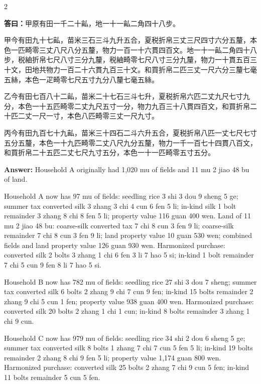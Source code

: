 \documentclass[11pt,a4paper]{article}
\newcommand{\AnswerText}[1]{\par\noindent\textbf{\color{answercolor}答曰：}#1\par}
\newcommand{\AnswerEn}[1]{\par\noindent\textbf{\color{answercolor}Answer:} #1\par}
\begin{document}
\begin{paracol}{2}
\AnswerText{甲原有田一千二十畆，地一十一畆二角四十八步。

甲今有田九十七畆，苗米三石三斗九升五合，夏税折帛三丈三尺四寸六分五釐，本色一匹畸零三丈八尺八分五釐，物力一百一十六貫四百文。地一十一畆二角四十八步，税紬折帛七尺八寸三分九釐，税紬畸零七尺八寸三分九釐，物力一十貫五百三十文，田地共物力一百二十六貫九百三十文。和買折帛二匹三丈一尺六分三釐七毫五絲，本色一疋畸零七尺五寸九分八釐七毫五絲。

乙今有田七百八十二畆，苗米二十七石三斗七升，夏税折帛六匹二丈九尺七寸九分，本色一十五匹畸零二丈九尺五寸一分，物力九百三十八貫四百文，和買折帛二十匹二丈一尺一寸，本色八匹畸零三丈一尺九寸。

丙今有田九百七十九畆，苗米三十四石二斗六升五合，夏税折帛八匹一丈七尺七寸五分五釐，本色一十九匹畸零二丈八尺九分五釐，物力一千一百七十四貫八百文，和買折帛二十五匹二丈七尺九寸五分，本色一十一匹畸零五寸五分。}
\switchcolumn
\AnswerEn{Household A originally had 1,020 mu of fields and 11 mu 2 jiao 48 bu of land.

Household A now has 97 mu of fields: seedling rice 3 shi 3 dou 9 sheng 5 ge; summer tax converted silk 3 zhang 3 chi 4 cun 6 fen 5 li; in-kind silk 1 bolt remainder 3 zhang 8 chi 8 fen 5 li; property value 116 guan 400 wen. Land of 11 mu 2 jiao 48 bu: coarse-silk converted tax 7 chi 8 cun 3 fen 9 li; coarse-silk remainder 7 chi 8 cun 3 fen 9 li; land property value 10 guan 530 wen; combined fields and land property value 126 guan 930 wen. Harmonized purchase: converted silk 2 bolts 3 zhang 1 chi 6 fen 3 li 7 hao 5 si; in-kind 1 bolt remainder 7 chi 5 cun 9 fen 8 li 7 hao 5 si.

Household B now has 782 mu of fields: seedling rice 27 shi 3 dou 7 sheng; summer tax converted silk 6 bolts 2 zhang 9 chi 7 cun 9 fen; in-kind 15 bolts remainder 2 zhang 9 chi 5 cun 1 fen; property value 938 guan 400 wen. Harmonized purchase: converted silk 20 bolts 2 zhang 1 chi 1 cun; in-kind 8 bolts remainder 3 zhang 1 chi 9 cun.

Household C now has 979 mu of fields: seedling rice 34 shi 2 dou 6 sheng 5 ge; summer tax converted silk 8 bolts 1 zhang 7 chi 7 cun 5 fen 5 li; in-kind 19 bolts remainder 2 zhang 8 chi 9 fen 5 li; property value 1,174 guan 800 wen. Harmonized purchase: converted silk 25 bolts 2 zhang 7 chi 9 cun 5 fen; in-kind 11 bolts remainder 5 cun 5 fen.}
\switchcolumn*


\end{paracol}
\end{document}
